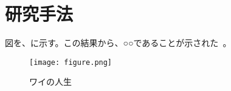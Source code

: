 \documentclass[/workdir/src/main.tex]{subfiles}
\begin{document}
\section{研究手法}

\lipsum[2]

図を、に示す。この結果から、○○であることが示された~\cite{bibtexkey}。

\clearpage
\begin{figure}[h]
  \centering
  \texttt{[image: figure.png]}
  \caption{ワイの人生}
  \label{fig:samplefig}
\end{figure}

\ifSubfilesClassLoaded{%
  \clearpage%
}{}
\end{document}
